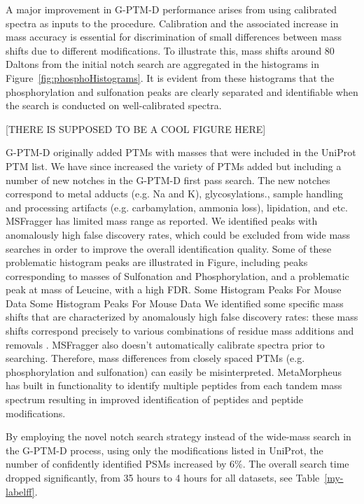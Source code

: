 \documentclass[journal=jprobs,manuscript=article]{achemso}
\begin{document}
A major improvement in G-PTM-D performance arises from using calibrated spectra as inputs to the procedure. 
Calibration and the associated increase in mass accuracy is essential for discrimination of small differences between mass shifts due to different modifications.
To illustrate this, mass shifts around 80 Daltons from the initial notch search are aggregated in the histograms in Figure~\ref{fig:phosphoHistograms}.
It is evident from these histograms that the phosphorylation and sulfonation peaks are clearly separated and identifiable when the search is conducted on well-calibrated spectra.

[THERE IS SUPPOSED TO BE A COOL FIGURE HERE]

G-PTM-D originally added PTMs with masses that were included in the UniProt PTM list. 
We have since increased the variety of PTMs added but including a number of new notches in the G-PTM-D first pass search. The new notches correspond to metal adducts (e.g. Na and K), glycosylations., sample handling and processing artifacts (e.g. carbamylation, ammonia loss), lipidation, and etc.
MSFragger has limited mass range as reported. We identified peaks with anomalously high false discovery rates, which could be excluded from wide mass searches in order to improve the overall identification quality.
Some of these problematic histogram peaks are illustrated in Figure, including peaks corresponding to masses of Sulfonation and Phosphorylation, and a problematic peak at mass of Leucine, with a high FDR.
Some Histogram Peaks For Mouse Data Some Histogram Peaks For Mouse Data We identified some specific mass shifts that are characterized by anomalously high false discovery rates: these mass shifts correspond precisely to various combinations of residue mass additions and removals .
MSFragger also doesn’t automatically calibrate spectra prior to searching.
Therefore, mass differences from closely spaced PTMs (e.g. phosphorylation and sulfonation) can easily be misinterpreted.
MetaMorpheus has built in functionality to identify multiple peptides from each tandem mass spectrum resulting in improved identification of peptides and peptide modifications.


By employing the novel notch search strategy instead of the wide-mass search in the G-PTM-D process, using only the modifications listed in UniProt, the number of confidently identified PSMs increased by 6\%.
The overall search time dropped significantly, from 35 hours to 4 hours for all datasets, see Table~\ref{my-labelff}.
\end{document}
